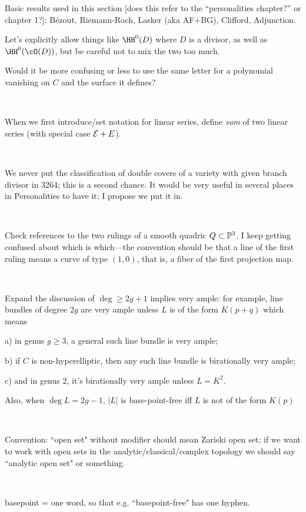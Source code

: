 \documentclass[12pt, leqno]{book}
\begin{document}
Basic results used in this section [does this refer to the ``personalities chapter?'' or chapter 1?]: B\'ezout, Riemann-Roch, Lasker (aka AF+BG), Clifford, Adjunction.

Let's explicitly allow things like $\HH^0(D)$ where $D$ is a divisor, as well as $\HH^0(\cO(D))$, but be careful not to mix the two too much.

Would it be more confusing or less to use the same letter for a polynomial vanishing on $C$ and the surface it defines?

\

When we first introduce/set notation for linear series, define \emph{sum} of two linear series 
(with special case $\cE + E$).

\

We never put the classification of double covers of a variety with given branch divisor in 3264; this is a second chance. It would be very useful in several places in Personalities to have it; I propose we put it in.

\

Check references to the two rulings of a smooth quadric $Q \subset \PP^3$. I keep getting confused about which is which---the convention should be that a line of the first ruling means a curve of type $(1,0)$, that is, a fiber of the first projection map.

\

Expand the discussion of $\deg \geq 2g+1$ implies very ample: for example, line bundles of degree $2g$ are very ample unless $L$ is of the form $K(p+q)$ which means 

a) in genus $g \geq 3$, a general such line bundle is very ample; 

b) if $C$ is non-hyperelliptic, then any such line bundle is birationally very ample;

c) and in genus 2, it's birationally very ample unless $L = K^2$.

Also, when $\deg L = 2g-1$, $|L|$ is base-point-free iff $L$ is not of the form $K(p)$

\

Convention: ``open set" without modifier should mean Zariski open set; if we want to work with open sets in the analytic/classical/complex topology we should say ``analytic open set" or something.

\

basepoint = one word, so that e.g. ``basepoint-free" has one hyphen.

\
\end{document}

